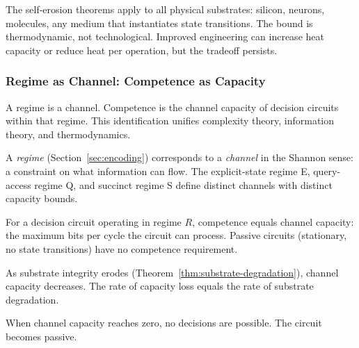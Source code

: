 \begin{remark}
The self-erosion theorems apply to all physical substrates: silicon, neurons, molecules, any medium that instantiates state transitions. The bound is thermodynamic, not technological. Improved engineering can increase heat capacity or reduce heat per operation, but the tradeoff persists.
\end{remark}

\subsubsection{Regime as Channel: Competence as Capacity}\label{sec:regime-channel}

A regime is a channel. Competence is the channel capacity of decision circuits within that regime. This identification unifies complexity theory, information theory, and thermodynamics.

\begin{definition}\label{def:regime-channel}
A \emph{regime} (Section~\ref{sec:encoding}) corresponds to a \emph{channel} in the Shannon sense: a constraint on what information can flow. The explicit-state regime E, query-access regime Q, and succinct regime S define distinct channels with distinct capacity bounds.
\end{definition}

\begin{theorem}\label{thm:competence-capacity}
For a decision circuit operating in regime $R$, competence equals channel capacity: the maximum bits per cycle the circuit can process. Passive circuits (stationary, no state transitions) have no competence requirement.
\end{theorem}

\begin{corollary}\label{cor:channel-degradation}
As substrate integrity erodes (Theorem~\ref{thm:substrate-degradation}), channel capacity decreases. The rate of capacity loss equals the rate of substrate degradation.
\end{corollary}

\begin{corollary}\label{cor:zero-capacity}
When channel capacity reaches zero, no decisions are possible. The circuit becomes passive.
\end{corollary}

